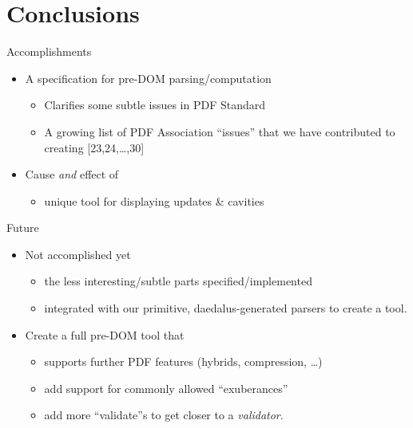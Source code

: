 \documentclass[t,10pt,xcolor={dvipsnames}]{beamer}
\begin{document}
\section{Conclusions}
\label{sec:org1dcc53c}
\begin{frame}[label={sec:orgebcb3d4}]{Accomplishments}
\begin{itemize}
\item A specification for pre-DOM parsing/computation
\begin{itemize}
\item Clarifies some subtle issues in PDF Standard
\item A growing list of PDF Association “issues” that we have contributed to
creating [23,24,\ldots{},30]
\end{itemize}
\item Cause \emph{and} effect of
\begin{itemize}
\item unique tool for displaying updates \& cavities
\end{itemize}
\end{itemize}
\end{frame}

\begin{frame}[label={sec:org788cc86}]{Future}
\begin{itemize}
\item Not accomplished yet
\begin{itemize}
\item the less interesting/subtle parts specified/implemented
\item integrated with our primitive, daedalus-generated parsers to create
a  tool.
\end{itemize}

\item Create a full pre-DOM tool that
\begin{itemize}
\item supports further PDF features (hybrids, compression, …)
\item add support for commonly allowed “exuberances”
\item add more “validate”s to get closer to a \emph{validator}.
\end{itemize}
\end{itemize}
\end{frame}
\end{document}
